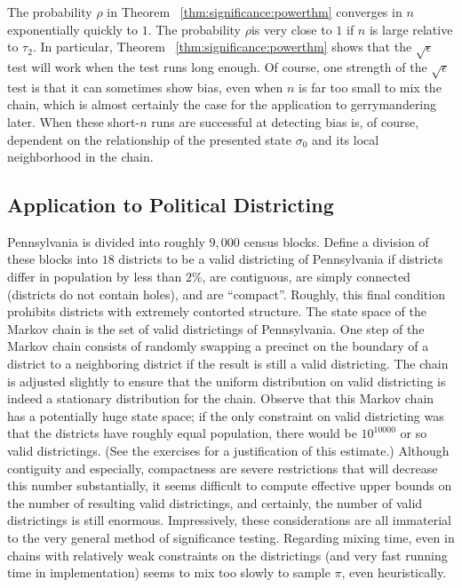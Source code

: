 \documentclass[12pt]{article}
\begin{document}
\begin{remark}
    The probability \( \rho \) in Theorem~%
    \ref{thm:significance:powerthm} converges in \( n \) exponentially
    quickly to \( 1 \).  The probability \( \rho \)is very close to \( 1
    \) if \( n \) is large relative to \( \tau_2 \).  In particular,
    Theorem~%
    \ref{thm:significance:powerthm} shows that the \( \sqrt{\epsilon} \)
    test will work when the test runs long enough.  Of course, one
    strength of the \( \sqrt{\epsilon} \) test is that it can sometimes
    show bias, even when \( n \) is far too small to mix the chain,
    which is almost certainly the case for the application to
    gerrymandering later.  When these short-\( n \) runs are successful
    at detecting bias is, of course, dependent on the relationship of
    the presented state \( \sigma_0 \) and its local neighborhood in the
    chain.
\end{remark}


\subsection*{Application to Political Districting}

Pennsylvania is divided into roughly \( 9,000 \) census blocks.  Define
a division of these blocks into \( 18 \) districts to be a valid
districting of Pennsylvania if districts differ in population by less
than \( 2\% \), are contiguous, are simply connected (districts do not
contain holes), and are ``compact''.  Roughly, this final condition
prohibits districts with extremely contorted structure.  The state space
of the Markov chain is the set of valid districtings of Pennsylvania.
One step of the Markov chain consists of randomly swapping a precinct on
the boundary of a district to a neighboring district if the result is
still a valid districting.  The chain is adjusted slightly to ensure
that the uniform distribution on valid districting is indeed a
stationary distribution for the chain.  Observe that this Markov chain
has a potentially huge state space; if the only constraint on valid
districting was that the districts have roughly equal population, there
would be \( 10^{10000} \) or so valid districtings.  (See the exercises
for a justification of this estimate.) Although contiguity and
especially, compactness are severe restrictions that will decrease this
number substantially, it seems difficult to compute effective upper
bounds on the number of resulting valid districtings, and certainly, the
number of valid districtings is still enormous.  Impressively, these
considerations are all immaterial to the very general method of
significance testing. Regarding mixing time, even in chains with
relatively weak constraints on the districtings (and very fast running
time in implementation) seems to mix too slowly to sample \( \pi \),
even heuristically.
\end{document}
